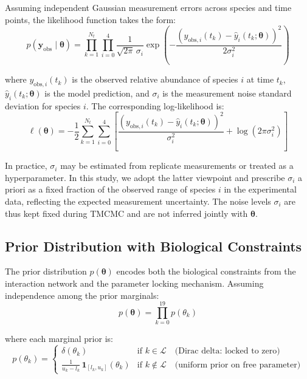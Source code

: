 \documentclass[11pt,a4paper]{article}
\begin{document}
Assuming independent Gaussian measurement errors across species and time points, the likelihood function takes the form:
\begin{equation}
p(\mathbf{y}_{\mathrm{obs}} \mid \boldsymbol{\theta}) = \prod_{k=1}^{N_t} \prod_{i=0}^{4} \frac{1}{\sqrt{2\pi}\,\sigma_i} \exp\!\left( -\frac{\left(y_{\mathrm{obs},i}(t_k) - \hat{y}_i(t_k; \boldsymbol{\theta})\right)^2}{2\sigma_i^2} \right)
\label{eq:likelihood}
\end{equation}

\noindent where $y_{\mathrm{obs},i}(t_k)$ is the observed relative abundance of species $i$ at time $t_k$, $\hat{y}_i(t_k; \boldsymbol{\theta})$ is the model prediction, and $\sigma_i$ is the measurement noise standard deviation for species $i$. The corresponding log-likelihood is:
\begin{equation}
\ell(\boldsymbol{\theta}) = -\frac{1}{2} \sum_{k=1}^{N_t} \sum_{i=0}^{4} \left[ \frac{\left(y_{\mathrm{obs},i}(t_k) - \hat{y}_i(t_k; \boldsymbol{\theta})\right)^2}{\sigma_i^2} + \log(2\pi \sigma_i^2) \right]
\label{eq:loglik}
\end{equation}

\noindent In practice, $\sigma_i$ may be estimated from replicate measurements or treated as a hyperparameter. In this study, we adopt the latter viewpoint and prescribe $\sigma_i$ a priori as a fixed fraction of the observed range of species $i$ in the experimental data, reflecting the expected measurement uncertainty. The noise levels $\sigma_i$ are thus kept fixed during TMCMC and are not inferred jointly with $\boldsymbol{\theta}$.

\subsection{Prior Distribution with Biological Constraints}

The prior distribution $p(\boldsymbol{\theta})$ encodes both the biological constraints from the interaction network and the parameter locking mechanism. Assuming independence among the prior marginals:
\begin{equation}
p(\boldsymbol{\theta}) = \prod_{k=0}^{19} p(\theta_k)
\end{equation}

\noindent where each marginal prior is:
\begin{equation}
p(\theta_k) = \begin{cases}
\delta(\theta_k) & \text{if } k \in \mathcal{L} \quad \text{(Dirac delta: locked to zero)} \\[4pt]
\displaystyle\frac{1}{u_k - l_k}\, \mathbf{1}_{[l_k, u_k]}(\theta_k) & \text{if } k \notin \mathcal{L} \quad \text{(uniform prior on free parameter)}
\end{cases}
\label{eq:prior}
\end{equation}
\end{document}
